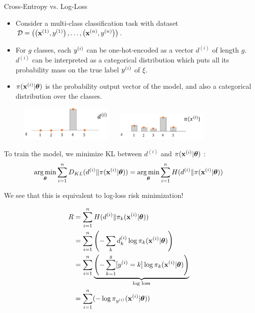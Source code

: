 \documentclass[11pt,compress,t,notes=noshow, xcolor=table]{beamer}
\begin{document}
\begin{vbframe}{Cross-Entropy vs. Log-Loss}

  \begin{itemize}
    \item Consider a multi-class classification task with dataset $\mathcal{D} = \left( \left(\mathbf{x}^{(1)}, y^{(1)}\right), \ldots, \left(\mathbf{x}^{(n)}, y^{(n)}\right)\right)$.
    \item For $g$ classes, each $y^{(i)}$ can be one-hot-encoded as a vector $d^{(i)}$ of length $g$. $d^{(i)}$ can be interpreted as a categorical distribution which puts all its probability mass on the true label $y^{(i)}$ of $\xi$.
    \item $\pi(\mathbf{x}^{(i)}|\bm{\theta})$ is the probability output vector of the model, and also a categorical distribution over the classes.

  \end{itemize}
\lz
\begin{figure}
\includegraphics[width=0.4\textwidth]{figure_man/multinoulli.png}
~~
\includegraphics[width=0.4\textwidth]{figure_man/multiclass-predictive.png}
\end{figure}
    \framebreak

    
To train the model, we minimize KL between $d^{(i)}$ and $\pi(\mathbf{x}^{(i)}|\bm{\theta})$ :
$$ \operatorname*{arg\,min}_{\bm{\theta}} \sum_{i=1}^n D_{KL} (d^{(i)} \| \pi(\mathbf{x}^{(i)}|\bm{\theta})) = \operatorname*{arg\,min}_{\bm{\theta}} \sum_{i=1}^n  H(d^{(i)} \| \pi(\mathbf{x}^{(i)}|\bm{\theta})) $$
  
We see that this is equivalent to log-loss risk minimization!
  \begin{footnotesize}
    \begin{equation*}
      \begin{split}
               R &= \sum\limits_{i=1}^n  H(d^{(i)} \| \pi_k(\mathbf{x}^{(i)}|\bm{\theta})) \\
                 &= \sum\limits_{i=1}^n \left( - \sum_k d^{(i)}_k \log\pi_k(\mathbf{x}^{(i)}|\bm{\theta}) \right) \\
                 & = \sum\limits_{i=1}^n \underbrace{ \left( -\sum_{k = 1}^g [y^{(i)} = k]\log \pi_{k}(\mathbf{x}^{(i)}|\bm{\theta}) \right) }_{\text{log loss}} \\
                 & = \sum\limits_{i=1}^n (-\log\pi_{y^{(i)}}(\mathbf{x}^{(i)}|\bm{\theta})) 
      \end{split}
    \end{equation*}
  \end{footnotesize}
\end{vbframe}
\end{document}
